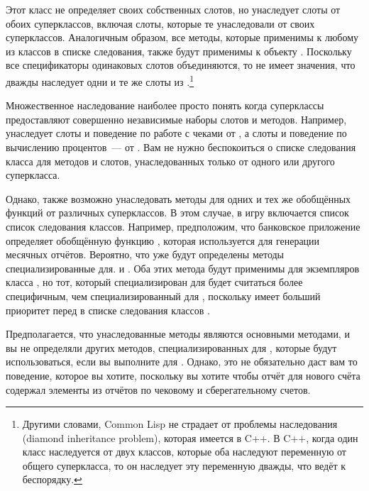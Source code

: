 Этот класс не определяет своих собственных слотов, но унаследует слоты от обоих
суперклассов, включая слоты, которые те унаследовали от своих суперклассов.  Аналогичным
образом, все методы, которые применимы к любому из классов в списке следования, также
будут применимы к объекту .  Поскольку все спецификаторы
одинаковых слотов объединяются, то не имеет значения, что 
дважды наследует одни и те же слоты из .\footnote{Другими словами,
  Common Lisp не страдает от проблемы наследования (diamond inheritance problem), которая
  имеется в C++.  В C++, когда один класс наследуется от двух классов, которые оба
  наследуют переменную от общего суперкласса, то он наследует эту переменную дважды, что
  ведёт к беспорядку.}

Множественное наследование наиболее просто понять когда суперклассы предоставляют
совершенно независимые наборы слотов и методов.  Например, 
унаследует слоты и поведение по работе с чеками от , а слоты и
поведение по вычислению процентов~--- от .  Вам не нужно беспокоиться
о списке следования класса для методов и слотов, унаследованных только от одного или
другого суперкласса.

Однако, также возможно унаследовать методы для одних и тех же обобщённых функций от
различных суперклассов.  В этом случае, в игру включается список список следования
классов.  Например, предположим, что банковское приложение определяет обобщённую функцию
, которая используется для генерации месячных отчётов.  Вероятно,
что уже будут определены методы  специализированные для.
 и .  Оба этих метода будут применимы для
экземпляров класса , но тот, который специализирован для
 будет считаться более специфичным, чем специализированный для
, поскольку  имеет больший приоритет перед
 в списке следования классов .

Предполагается, что унаследованные методы являются основными методами, и вы не определяли
других методов, специализированных для , которые будут
использоваться, если вы выполните  для .
Однако, это не обязательно даст вам то поведение, которое вы хотите, поскольку вы хотите
чтобы отчёт для нового счёта содержал элементы из отчётов по чековому и сберегательному
счетов.

